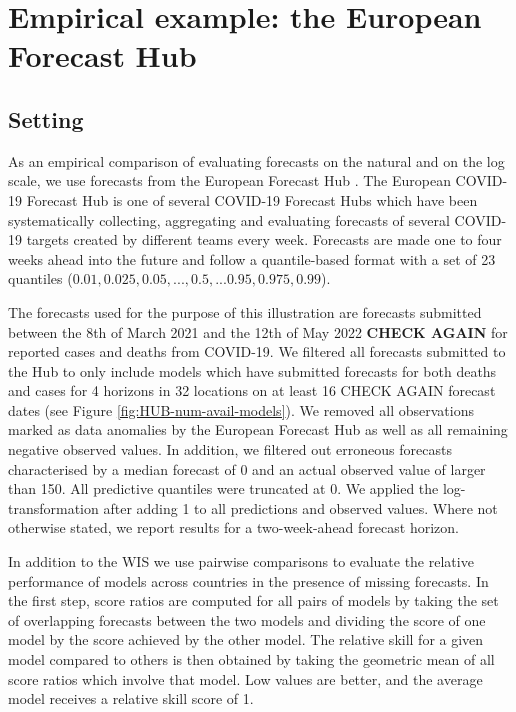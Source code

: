 \documentclass{article}
\begin{document}
\section{Empirical example: the European Forecast Hub}
\label{sec:results}

\subsection{Setting}

As an empirical comparison of evaluating forecasts on the natural and on the log scale, we use forecasts from the European Forecast Hub \citep{europeancovid-19forecasthubEuropeanCovid19Forecast2021, sherrattPredictivePerformanceMultimodel2022}. 
The European COVID-19 Forecast Hub is one of several COVID-19 Forecast Hubs \citep{cramerEvaluationIndividualEnsemble2021, bracherShorttermForecastingCOVID192021} which have been systematically collecting, aggregating and evaluating forecasts of several COVID-19 targets created by different teams every week. Forecasts are made one to four weeks ahead into the future and follow a quantile-based format with a set of 23 quantiles ($0.01, 0.025, 0.05, ..., 0.5, ... 0.95, 0.975, 0.99$). 

The forecasts used for the purpose of this illustration are forecasts submitted between the 8th of March 2021 and the 12th of May 2022 \textbf{CHECK AGAIN} for reported cases and deaths from COVID-19. We filtered all forecasts submitted to the Hub to only include models which have submitted forecasts for both deaths and cases for 4 horizons in 32 locations on at least 16 CHECK AGAIN forecast dates (see Figure \ref{fig:HUB-num-avail-models}). We removed all observations marked as data anomalies by the European Forecast Hub \citep{sherrattPredictivePerformanceMultimodel2022} as well as all remaining negative observed values. In addition, we filtered out erroneous forecasts characterised by a median forecast of 0 and an actual observed value of larger than 150. All predictive quantiles were truncated at 0. We applied the log-transformation after adding 1 to all predictions and observed values. Where not otherwise stated, we report results for a two-week-ahead forecast horizon. 

In addition to the WIS we use pairwise comparisons \citep{cramerEvaluationIndividualEnsemble2021} to evaluate the relative performance of models across countries in the presence of missing forecasts. In the first step, score ratios are computed for all pairs of models by taking the set of overlapping forecasts between the two models and dividing the score of one model by the score achieved by the other model. The relative skill for a given model compared to others is then obtained by taking the geometric mean of all score ratios which involve that model. Low values are better, and the average model receives a relative skill score of 1. 
\end{document}
